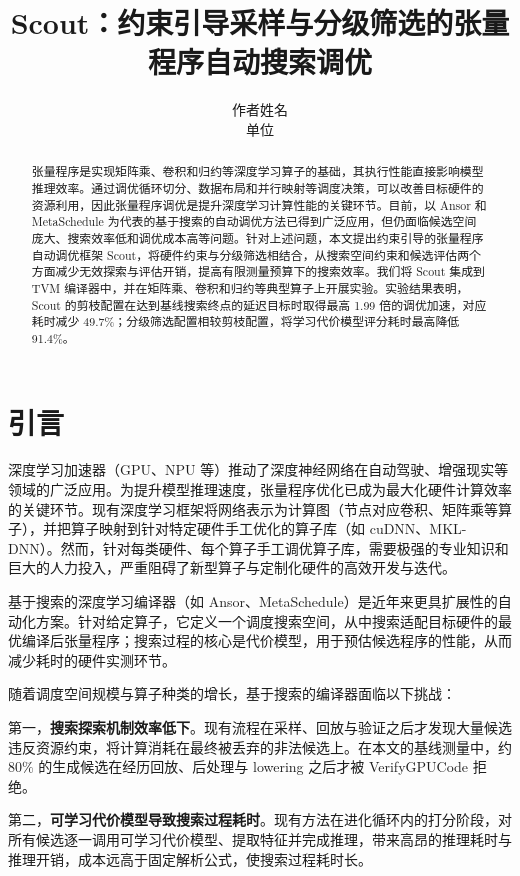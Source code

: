 \documentclass[11pt,twocolumn]{ctexart}
\title{\bfseries Scout：约束引导采样与分级筛选的张量程序自动搜索调优}
\author{作者姓名 \\ \small 单位}
\date{}
\begin{document}
\maketitle

\begin{abstract}
张量程序是实现矩阵乘、卷积和归约等深度学习算子的基础，其执行性能直接影响模型推理效率。通过调优循环切分、数据布局和并行映射等调度决策，可以改善目标硬件的资源利用，因此张量程序调优是提升深度学习计算性能的关键环节。目前，以 Ansor 和 MetaSchedule 为代表的基于搜索的自动调优方法已得到广泛应用，但仍面临候选空间庞大、搜索效率低和调优成本高等问题。针对上述问题，本文提出约束引导的张量程序自动调优框架 Scout，将硬件约束与分级筛选相结合，从搜索空间约束和候选评估两个方面减少无效探索与评估开销，提高有限测量预算下的搜索效率。我们将 Scout 集成到 TVM 编译器中，并在矩阵乘、卷积和归约等典型算子上开展实验。实验结果表明，Scout 的剪枝配置在达到基线搜索终点的延迟目标时取得最高 1.99 倍的调优加速，对应耗时减少 49.7\%；分级筛选配置相较剪枝配置，将学习代价模型评分耗时最高降低 91.4\%。
\end{abstract}

\section{引言}
\label{sec:intro}
深度学习加速器（GPU、NPU 等）推动了深度神经网络在自动驾驶、增强现实等领域的广泛应用。为提升模型推理速度，张量程序优化已成为最大化硬件计算效率的关键环节。现有深度学习框架将网络表示为计算图（节点对应卷积、矩阵乘等算子），并把算子映射到针对特定硬件手工优化的算子库（如 cuDNN、MKL-DNN）。然而，针对每类硬件、每个算子手工调优算子库，需要极强的专业知识和巨大的人力投入，严重阻碍了新型算子与定制化硬件的高效开发与迭代。

基于搜索的深度学习编译器（如 Ansor、MetaSchedule）是近年来更具扩展性的自动化方案。针对给定算子，它定义一个调度搜索空间，从中搜索适配目标硬件的最优编译后张量程序；搜索过程的核心是代价模型，用于预估候选程序的性能，从而减少耗时的硬件实测环节。

随着调度空间规模与算子种类的增长，基于搜索的编译器面临以下挑战：

第一，\textbf{搜索探索机制效率低下}。现有流程在采样、回放与验证之后才发现大量候选违反资源约束，将计算消耗在最终被丢弃的非法候选上。在本文的基线测量中，约 $80\%$ 的生成候选在经历回放、后处理与 lowering 之后才被 VerifyGPUCode 拒绝。

第二，\textbf{可学习代价模型导致搜索过程耗时}。现有方法在进化循环内的打分阶段，对所有候选逐一调用可学习代价模型、提取特征并完成推理，带来高昂的推理耗时与推理开销，成本远高于固定解析公式，使搜索过程耗时长。
\end{document}
